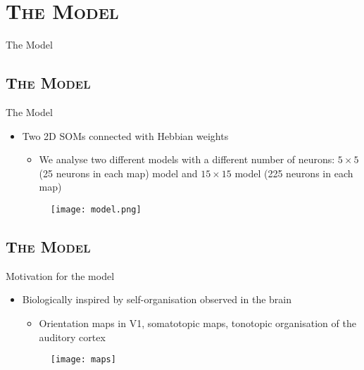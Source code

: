 \documentclass[xcolor=x11names,dvipsnames,compress]{beamer}
\renewcommand{\(}{\begin{columns}}
\renewcommand{\)}{\end{columns}}
\newcommand{\<}[1]{\begin{column}{#1}}
\renewcommand{\>}{\end{column}}
\begin{document}

\section{\scshape The Model}
\begin{frame}[noframenumbering]
\Large The Model
\end{frame}

\subsection{\scshape The Model}
\begin{frame}{The Model}
\begin{itemize}
\item Two 2D SOMs connected with Hebbian weights
  \begin{itemize}
   \item We analyse two different models with a different number of neurons: $5\times5$ (25 neurons in each map) model and $15\times15$ model (225 neurons in each map)
  \end{itemize}
  \begin{figure}
  \texttt{[image: model.png]}
  \end{figure}
\end{itemize}
\end{frame}

\subsection{\scshape The Model}
\begin{frame}{Motivation for the model}
\begin{itemize}
\item Biologically inspired by self-organisation observed in the brain 
	\begin{itemize}
	\item Orientation maps in V1, somatotopic maps, tonotopic organisation of the auditory cortex
  	\end{itemize}
\begin{figure}
\texttt{[image: maps]}
\end{figure}

\end{itemize}
\end{frame}
\end{document}
